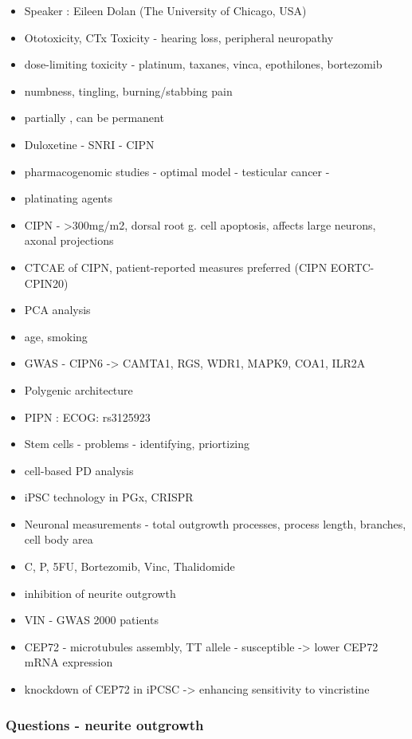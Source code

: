 \documentclass[]{book}
\providecommand{\tightlist}{%
  \setlength{\itemsep}{0pt}\setlength{\parskip}{0pt}}
\begin{document}
\begin{itemize}
\tightlist
\item
  Speaker : Eileen Dolan (The University of Chicago, USA)
\item
  Ototoxicity, CTx Toxicity - hearing loss, peripheral neuropathy
\item
  dose-limiting toxicity - platinum, taxanes, vinca, epothilones,
  bortezomib
\item
  numbness, tingling, burning/stabbing pain
\item
  partially , can be permanent
\item
  Duloxetine - SNRI - CIPN
\item
  pharmacogenomic studies - optimal model - testicular cancer -
\item
  platinating agents
\item
  CIPN - \textgreater{}300mg/m2, dorsal root g. cell apoptosis, affects
  large neurons, axonal projections
\item
  CTCAE of CIPN, patient-reported measures preferred (CIPN EORTC-CPIN20)
\item
  PCA analysis
\item
  age, smoking
\item
  GWAS - CIPN6 -\textgreater{} CAMTA1, RGS, WDR1, MAPK9, COA1, ILR2A
\item
  Polygenic architecture
\item
  PIPN : ECOG: rs3125923
\item
  Stem cells - problems - identifying, priortizing
\item
  cell-based PD analysis
\item
  iPSC technology in PGx, CRISPR
\item
  Neuronal measurements - total outgrowth processes, process length,
  branches, cell body area
\item
  C, P, 5FU, Bortezomib, Vinc, Thalidomide
\item
  inhibition of neurite outgrowth
\item
  VIN - GWAS 2000 patients
\item
  CEP72 - microtubules assembly, TT allele - susceptible -\textgreater{}
  lower CEP72 mRNA expression
\item
  knockdown of CEP72 in iPCSC -\textgreater{} enhancing sensitivity to
  vincristine
\end{itemize}

\subsubsection{Questions - neurite
outgrowth}\label{questions---neurite-outgrowth}
\end{document}
